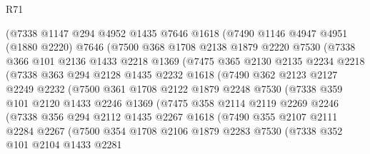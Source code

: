 \begin{lexlean}{R71}
\begin{coremodule}
        (@7338
          @1147
          @294
          @4952
          @1435
          @7646
          @1618
          (@7490
            @1146
            @4947
            @4951
            (@1880 @2220)
            @7646
            (@7500
              @368
              @1708
              @2138
              @1879
              @2220
              @7530
              (@7338
                @366
                @101
                @2136
                @1433
                @2218
                @1369
                (@7475
                  @365
                  @2130
                  @2135
                  @2234
                  @2218
                  (@7338
                    @363
                    @294
                    @2128
                    @1435
                    @2232
                    @1618
                    (@7490
                      @362
                      @2123
                      @2127
                      @2249
                      @2232
                      (@7500
                        @361
                        @1708
                        @2122
                        @1879
                        @2248
                        @7530
                        (@7338
                          @359
                          @101
                          @2120
                          @1433
                          @2246
                          @1369
                          (@7475
                            @358
                            @2114
                            @2119
                            @2269
                            @2246
                            (@7338
                              @356
                              @294
                              @2112
                              @1435
                              @2267
                              @1618
                              (@7490
                                @355
                                @2107
                                @2111
                                @2284
                                @2267
                                (@7500
                                  @354
                                  @1708
                                  @2106
                                  @1879
                                  @2283
                                  @7530
                                  (@7338
                                    @352
                                    @101
                                    @2104
                                    @1433
                                    @2281

\end{coremodule}
\end{lexlean}
